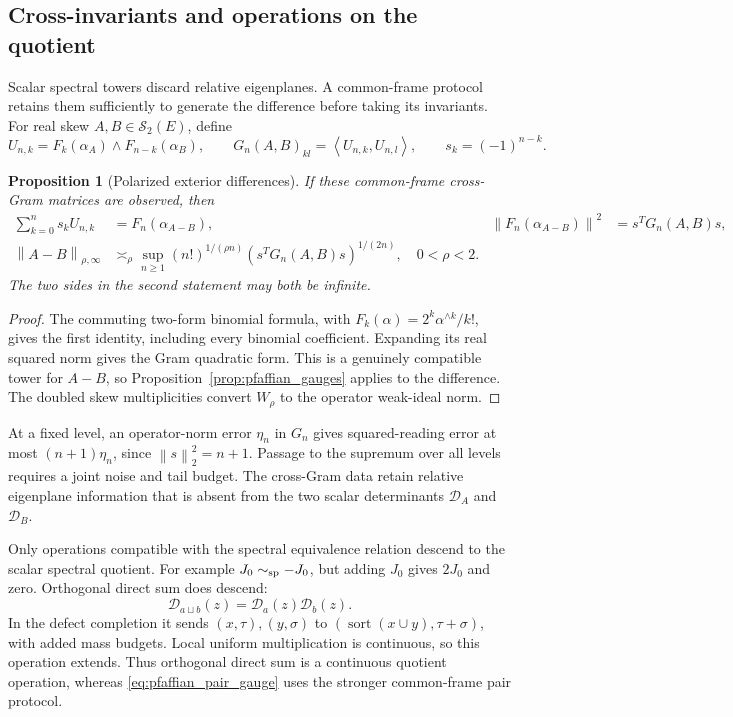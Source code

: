 \documentclass[11pt,a4paper]{amsart}
\numberwithin{equation}{section}
\newtheorem{proposition}[theorem]{Proposition}
\theoremstyle{definition}
\theoremstyle{remark}
\newcommand{\Sch}{\mathcal S}
\newcommand{\norm}[1]{\left\lVert#1\right\rVert}
\newcommand{\ip}[2]{\left\langle#1,#2\right\rangle}
\begin{document}
\subsection{Cross-invariants and operations on the quotient}\label{subsec:pfaffian_cross}
Scalar spectral towers discard relative eigenplanes. A common-frame protocol retains them sufficiently to generate the difference before taking its invariants. For real skew $A,B\in\Sch_2(E)$, define
\[
 U_{n,k}=F_k(\alpha_A)\wedge F_{n-k}(\alpha_B),\qquad
 G_n(A,B)_{kl}=\ip{U_{n,k}}{U_{n,l}},\qquad s_k=(-1)^{n-k}.
\]
\begin{proposition}[Polarized exterior differences]\label{prop:pfaffian_cross_difference}
If these common-frame cross-Gram matrices are observed, then
\begin{align}
 \sum_{k=0}^ns_kU_{n,k}&=F_n(\alpha_{A-B}),&
 \norm{F_n(\alpha_{A-B})}^2&=s^TG_n(A,B)s,\label{eq:pfaffian_difference_identity}\\
 \norm{A-B}_{\rho,\infty}
 &\asymp_\rho\sup_{n\ge1}(n!)^{1/(\rho n)}
                    (s^TG_n(A,B)s)^{1/(2n)},\quad 0<\rho<2.
 \label{eq:pfaffian_pair_gauge}
\end{align}
The two sides in the second statement may both be infinite.
\end{proposition}
\begin{proof}
The commuting two-form binomial formula, with $F_k(\alpha)=2^k\alpha^{\wedge k}/k!$, gives the first identity, including every binomial coefficient. Expanding its real squared norm gives the Gram quadratic form. This is a genuinely compatible tower for $A-B$, so Proposition~\ref{prop:pfaffian_gauges} applies to the difference. The doubled skew multiplicities convert $W_\rho$ to the operator weak-ideal norm.
\end{proof}

At a fixed level, an operator-norm error $\eta_n$ in $G_n$ gives squared-reading error at most $(n+1)\eta_n$, since $\norm s_2^2=n+1$. Passage to the supremum over all levels requires a joint noise and tail budget. The cross-Gram data retain relative eigenplane information that is absent from the two scalar determinants $\mathscr D_A$ and $\mathscr D_B$.

Only operations compatible with the spectral equivalence relation descend to the scalar spectral quotient. For example $J_0\sim_{\rm sp}-J_0$, but adding $J_0$ gives $2J_0$ and zero. Orthogonal direct sum does descend:
\[
 \mathscr D_{a\sqcup b}(z)=\mathscr D_a(z)\mathscr D_b(z).
\]
In the defect completion it sends $(x,\tau),(y,\sigma)$ to
$(\operatorname{sort}(x\cup y),\tau+\sigma)$, with added mass budgets. Local uniform multiplication is continuous, so this operation extends. Thus orthogonal direct sum is a continuous quotient operation, whereas \eqref{eq:pfaffian_pair_gauge} uses the stronger common-frame pair protocol.
\end{document}
